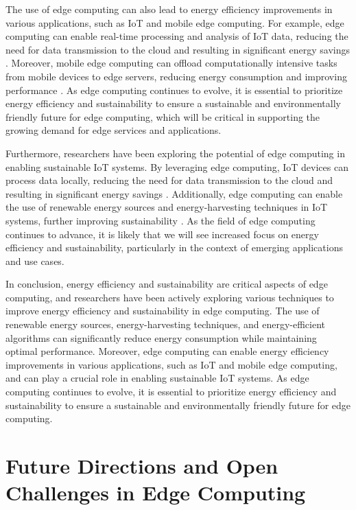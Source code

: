 \documentclass[11pt]{article}
\begin{document}
The use of edge computing can also lead to energy efficiency improvements in various applications, such as IoT and mobile edge computing. For example, edge computing can enable real-time processing and analysis of IoT data, reducing the need for data transmission to the cloud and resulting in significant energy savings \cite{ref80}. Moreover, mobile edge computing can offload computationally intensive tasks from mobile devices to edge servers, reducing energy consumption and improving performance \cite{ref81}. As edge computing continues to evolve, it is essential to prioritize energy efficiency and sustainability to ensure a sustainable and environmentally friendly future for edge computing, which will be critical in supporting the growing demand for edge services and applications.

Furthermore, researchers have been exploring the potential of edge computing in enabling sustainable IoT systems. By leveraging edge computing, IoT devices can process data locally, reducing the need for data transmission to the cloud and resulting in significant energy savings \cite{ref133}. Additionally, edge computing can enable the use of renewable energy sources and energy-harvesting techniques in IoT systems, further improving sustainability \cite{ref134}. As the field of edge computing continues to advance, it is likely that we will see increased focus on energy efficiency and sustainability, particularly in the context of emerging applications and use cases.

In conclusion, energy efficiency and sustainability are critical aspects of edge computing, and researchers have been actively exploring various techniques to improve energy efficiency and sustainability in edge computing. The use of renewable energy sources, energy-harvesting techniques, and energy-efficient algorithms can significantly reduce energy consumption while maintaining optimal performance. Moreover, edge computing can enable energy efficiency improvements in various applications, such as IoT and mobile edge computing, and can play a crucial role in enabling sustainable IoT systems. As edge computing continues to evolve, it is essential to prioritize energy efficiency and sustainability to ensure a sustainable and environmentally friendly future for edge computing.

\section{Future Directions and Open Challenges in Edge Computing}
\end{document}
